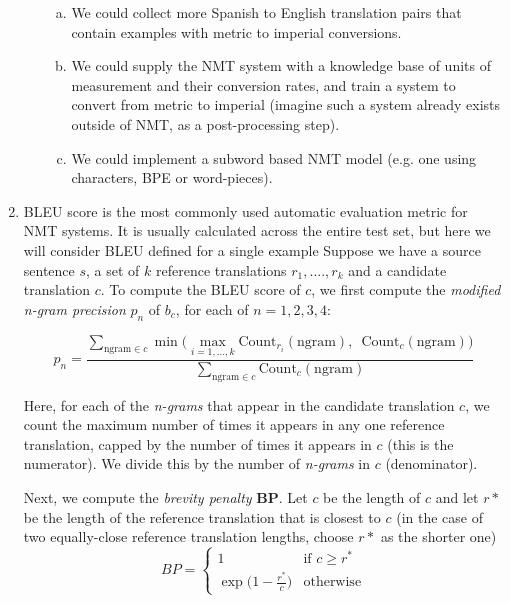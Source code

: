 \begin{enumerate}[1.]
\begin{enumerate}[3a.]
\begin{enumerate}[(a)]
\item We could collect more Spanish to English translation pairs that contain examples with metric to imperial conversions.
\item We could supply the NMT system with a knowledge base of units of measurement and their conversion rates, and train a system to convert from metric to imperial (imagine such a system already exists outside of NMT, as a post-processing step).
\item We could implement a subword based NMT model (e.g. one using characters, BPE or word-pieces).
\end{enumerate}


\end{enumerate}

\item 

BLEU score is the most commonly used automatic evaluation metric for NMT systems. It is usually calculated across the entire test set, but here we will consider BLEU defined for a single example Suppose we have a source sentence $s$, a set of $k$ reference translations $r_1,....,r_k$ and a candidate translation $c$. To compute the BLEU score of $c$, we first compute the {\em modified n-gram precision} $p_n$ of $b_c$, for each of $n = 1, 2, 3, 4$:

\begin{equation*}
p_n = \frac{ \displaystyle \sum_{\text{ngram} \in c} \min \bigg( \max_{i=1,\dots,k} \text{Count}_{r_i}(\text{ngram}), \enspace \text{Count}_{c}(\text{ngram}) \bigg) }{\displaystyle \sum_{\text{ngram}\in c} \text{Count}_{c}(\text{ngram})}
\end{equation*}

Here, for each of the {\em n-grams} that appear in the candidate translation $c$, we count the maximum number of times it appears in any one reference translation, capped by the number of times it appears in $c$ (this is the numerator). We divide this by the number of {\em n-grams} in $c$ (denominator).

Next, we compute the {\em brevity penalty} {\bf BP}. Let $c$ be the length of $c$ and let $r*$ be the length of the reference translation that is closest to $c$ (in the case of two equally-close reference translation lengths, choose $r*$ as the shorter one)
\begin{equation*}
    BP = 
    \begin{cases}
        1 & \text{if } c \ge r^* \\
        \exp \big( 1 - \frac{r^*}{c} \big) & \text{otherwise}
    \end{cases}
\end{equation*}


\end{enumerate}
